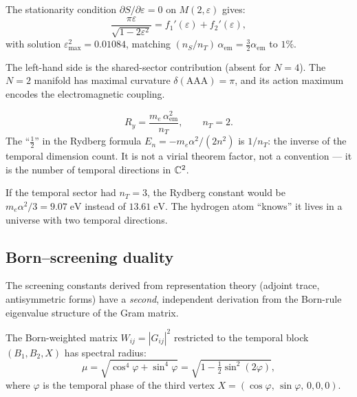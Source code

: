 \begin{remark}
\begin{theorem}[$N=2$ stationarity]
\label{thm:N2_stationarity}
The stationarity condition $\partial S/\partial\varepsilon = 0$ on $M(2,\varepsilon)$ gives:
\begin{equation}
\frac{\pi\varepsilon}{\sqrt{1 - 2\varepsilon^2}} = f_1'(\varepsilon) + f_2'(\varepsilon),
\end{equation}
with solution $\varepsilon_{\max}^2 = 0.01084$, matching $(n_S/n_T)\,\alpha_\text{em} = \tfrac{3}{2}\alpha_\text{em}$ to $1\%$.
\end{theorem}

The left-hand side is the shared-sector contribution (absent for $N=4$).  The $N=2$ manifold has maximal curvature $\delta(\mathrm{AAA}) = \pi$, and its action maximum encodes the electromagnetic coupling.

\begin{theorem}
\label{thm:rydberg_counting}
\begin{equation}
\boxed{R_y = \frac{m_e\,\alpha_\text{em}^2}{n_T}, \qquad n_T = 2.}
\end{equation}
The ``$\tfrac{1}{2}$'' in the Rydberg formula $E_n = -m_e\alpha^2/(2n^2)$ is $1/n_T$: the inverse of the temporal dimension count.  It is not a virial theorem factor, not a convention --- it is the number of temporal directions in $\mathbb{C}^2$.
\end{theorem}

If the temporal sector had $n_T = 3$, the Rydberg constant would be $m_e\alpha^2/3 = 9.07\;\text{eV}$ instead of $13.61\;\text{eV}$.  The hydrogen atom ``knows'' it lives in a universe with two temporal directions.

\subsection{Born--screening duality}
\label{sec:born_screening}

The screening constants derived from representation theory (adjoint trace, antisymmetric forms) have a \emph{second}, independent derivation from the Born-rule eigenvalue structure of the Gram matrix.

\begin{definition}
The Born-weighted matrix $W_{ij} = |G_{ij}|^2$ restricted to the temporal block $(B_1, B_2, X)$ has spectral radius:
\begin{equation}
\mu = \sqrt{\cos^4\varphi + \sin^4\varphi} = \sqrt{1 - \tfrac{1}{2}\sin^2(2\varphi)},
\end{equation}
where $\varphi$ is the temporal phase of the third vertex $X = (\cos\varphi,\,\sin\varphi,\,0,0,0)$.
\end{definition}


\end{remark}
